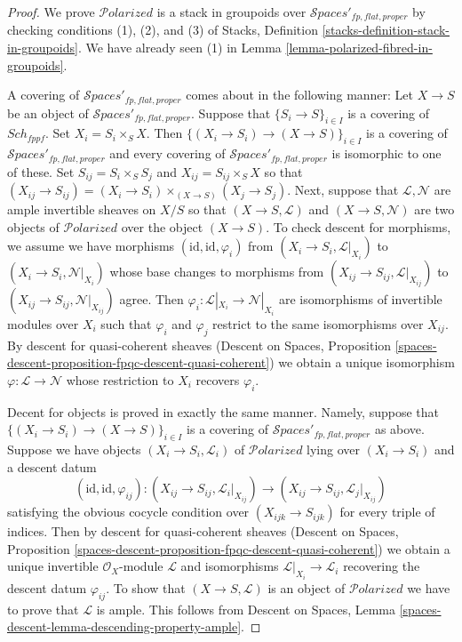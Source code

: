 \documentclass{stacks-project}
\theoremstyle{plain}
\theoremstyle{definition}
\theoremstyle{remark}
\numberwithin{equation}{subsection}
\def\Sch{\mathit{Sch}}
\def\Spacesstack{\mathcal{S}\!\mathit{paces}}
\def\Polarizedstack{\mathcal{P}\!\mathit{olarized}}
\begin{document}
\begin{proof}
We prove $\Polarizedstack$ is a stack in groupoids over
$\Spacesstack'_{fp, flat, proper}$
by checking conditions (1), (2), and (3)
of Stacks, Definition \ref{stacks-definition-stack-in-groupoids}.
We have already seen (1) in
Lemma \ref{lemma-polarized-fibred-in-groupoids}.

\medskip\noindent
A covering of $\Spacesstack'_{fp, flat, proper}$ comes about
in the following manner: Let $X \to S$ be an object of
$\Spacesstack'_{fp, flat, proper}$. Suppose that
$\{S_i \to S\}_{i \in I}$ is a covering of $\Sch_{fppf}$.
Set $X_i = S_i \times_S X$. Then $\{(X_i \to S_i) \to (X \to S)\}_{i \in I}$
is a covering of $\Spacesstack'_{fp, flat, proper}$ and
every covering of $\Spacesstack'_{fp, flat, proper}$ is isomorphic
to one of these. Set $S_{ij} = S_i \times_S S_j$ and
$X_{ij} = S_{ij} \times_S X$ so that $(X_{ij} \to S_{ij}) =
(X_i \to S_i) \times_{(X \to S)} (X_j \to S_j)$.
Next, suppose that $\mathcal{L}, \mathcal{N}$
are ample invertible sheaves on $X/S$ so that
$(X \to S, \mathcal{L})$ and $(X \to S, \mathcal{N})$
are two objects of $\Polarizedstack$ over the object $(X \to S)$.
To check descent for morphisms, we assume we have morphisms
$(\text{id}, \text{id}, \varphi_i)$ from
$(X_i \to S_i, \mathcal{L}|_{X_i})$ to
$(X_i \to S_i, \mathcal{N}|_{X_i})$
whose base changes to morphisms from
$(X_{ij} \to S_{ij}, \mathcal{L}|_{X_{ij}})$ to
$(X_{ij} \to S_{ij}, \mathcal{N}|_{X_{ij}})$
agree. Then
$\varphi_i : \mathcal{L}|_{X_i} \to \mathcal{N}|_{X_i}$
are isomorphisms of invertible modules over $X_i$ such that
$\varphi_i$ and $\varphi_j$ restrict to the same
isomorphisms over $X_{ij}$.
By descent for quasi-coherent sheaves
(Descent on Spaces, Proposition
\ref{spaces-descent-proposition-fpqc-descent-quasi-coherent})
we obtain a unique isomorphism $\varphi : \mathcal{L} \to \mathcal{N}$
whose restriction to $X_i$ recovers $\varphi_i$.

\medskip\noindent
Decent for objects is proved in exactly the same manner.
Namely, suppose that
$\{(X_i \to S_i) \to (X \to S)\}_{i \in I}$
is a covering of $\Spacesstack'_{fp, flat, proper}$
as above.
Suppose we have objects $(X_i \to S_i, \mathcal{L}_i)$
of $\Polarizedstack$ lying over $(X_i \to S_i)$
and a descent datum
$$
(\text{id}, \text{id}, \varphi_{ij}) :
(X_{ij} \to S_{ij}, \mathcal{L}_i|_{X_{ij}})
\to
(X_{ij} \to S_{ij}, \mathcal{L}_j|_{X_{ij}})
$$
satisfying the obvious cocycle condition over
$(X_{ijk} \to S_{ijk})$ for every triple of indices.
Then by
 descent for quasi-coherent sheaves
(Descent on Spaces, Proposition
\ref{spaces-descent-proposition-fpqc-descent-quasi-coherent})
we obtain a unique invertible $\mathcal{O}_X$-module
$\mathcal{L}$ and isomorphisms $\mathcal{L}|_{X_i} \to \mathcal{L}_i$
recovering the descent datum $\varphi_{ij}$.
To show that
$(X \to S, \mathcal{L})$ is an object of
$\Polarizedstack$ we have to prove that
$\mathcal{L}$ is ample. This follows from
Descent on Spaces, Lemma \ref{spaces-descent-lemma-descending-property-ample}.


\end{proof}
\end{document}
